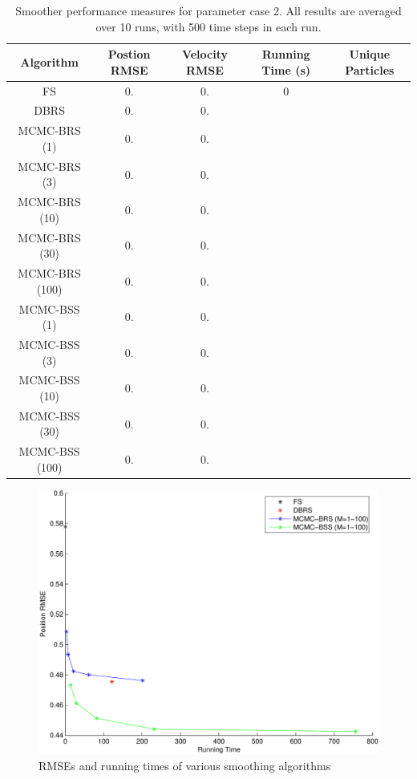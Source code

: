 \documentclass[journal]{IEEEtran}
\begin{document}
\begin{table}%
\begin{tabular}{|c||c|c|c|c|}
\hline
Algorithm & \begin{minipage}[c]{1cm} Postion RMSE \end{minipage} & \begin{minipage}[c]{1cm}  Velocity RMSE \end{minipage} & \begin{minipage}[c]{1cm}  Running Time (s) \end{minipage} & \begin{minipage}[c]{1cm}  Unique Particles \end{minipage} \\
\hline
FS 						& 0. & 0. & 0 &  \\
DBRS					& 0. & 0. &  &  \\
\hline
MCMC-BRS (1)	& 0. & 0. &  &  \\
MCMC-BRS (3)	& 0. & 0. &  &  \\
MCMC-BRS (10)	& 0. & 0. &  &  \\
MCMC-BRS (30)	& 0. & 0. &  &  \\
MCMC-BRS (100)& 0. & 0. &  &  \\
\hline
MCMC-BSS (1)	& 0. & 0. &  &  \\
MCMC-BSS (3)	& 0. & 0. &  &  \\
MCMC-BSS (10)	& 0. & 0. &  &  \\
MCMC-BSS (30)	& 0. & 0. &  &  \\
MCMC-BSS (100)& 0. & 0. &  &  \\
\hline
\end{tabular}
\caption{Smoother performance measures for parameter case 2. All results are averaged over 10 runs, with 500 time steps in each run.}
\label{tab:case2_performance}
\end{table}

\begin{figure}%
\includegraphics[width=\columnwidth]{case1_smoother_comparison_posRMSE_time-crop.pdf}%
\caption{RMSEs and running times of various smoothing algorithms}%
\label{fig:case1_rmse_vs_time}%
\end{figure}
\end{document}
